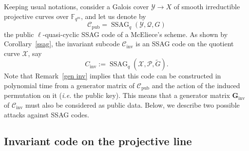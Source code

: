 \documentclass[10pt]{article}
\theoremstyle{definition}
\theoremstyle{definition}
\theoremstyle{definition}
\newcommand{\C}{\mathcal{C}}
\newcommand{\Fqm}{\mathbb{F}_{q^m}}
\newcommand{\X}{\mathcal{X}}
\newcommand{\Y}{\mathcal{Y}}
\newcommand{\PR}{\mathcal{P}}
\newcommand{\QR}{\mathcal{Q}}
\newcommand{\ssag}{\operatorname{SSAG}}
\begin{document}
 Keeping usual notations, consider a Galois cover $\Y \longrightarrow X$ of smooth irreductible projective curves over $\Fqm$, and let us denote by 
\[\mathcal{C}_{\mathrm{pub}} = \ssag_q(\Y,\QR,G)\]
the public $\ell$-quasi-cyclic SSAG code of a McEliece's scheme.
As shown by Corollary~\ref{ssag}, the invariant subcode $\mathcal{C}_{\mathrm{inv}}$ is an SSAG code on the quotient curve $\X$, say
\[C_{\mathrm{inv}} := \ssag_q(\X,\PR,\tilde{G}).\]
Note that Remark~\ref{gen inv} implies that this code can be constructed in polynomial time from a generator matrix of $\mathcal{C}_{\mathrm{pub}}$ and the action of the induced permutation on it (\textit{i.e.} the public key). This means that a generator matrix $\mathbf{G}_{\mathrm{inv}}$ of $\C_{\mathrm{inv}}$ must also be considered as public data. Below, we describe two possible attacks against SSAG codes. 


\subsection{Invariant code on the projective line} \label{section6.1}
\end{document}
